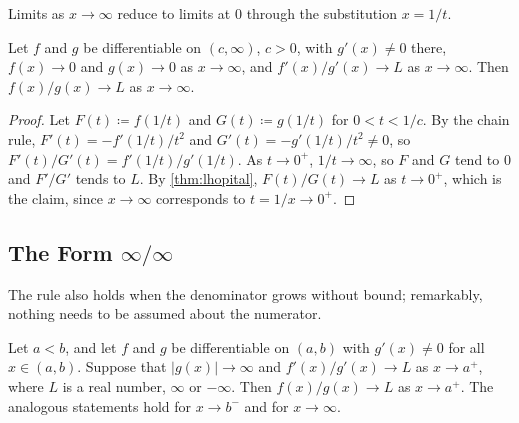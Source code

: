 Limits as $x\to\infty$ reduce to limits at $0$ through the substitution $x=1/t$.

\begin{corollary}
\label{cor:lhopital-infinity}
Let $f$ and $g$ be differentiable on $(c,\infty)$, $c>0$, with $g'(x)\ne0$ there, $f(x)\to0$ and $g(x)\to0$ as $x\to\infty$, and $f'(x)/g'(x)\to L$ as $x\to\infty$. Then $f(x)/g(x)\to L$ as $x\to\infty$.
\end{corollary}

\begin{proof}
Let $F(t)\coloneqq f(1/t)$ and $G(t)\coloneqq g(1/t)$ for $0<t<1/c$. By the chain rule, $F'(t)=-f'(1/t)/t^2$ and $G'(t)=-g'(1/t)/t^2\ne0$, so $F'(t)/G'(t)=f'(1/t)/g'(1/t)$. As $t\to0^+$, $1/t\to\infty$, so $F$ and $G$ tend to $0$ and $F'/G'$ tends to $L$. By \cref{thm:lhopital}, $F(t)/G(t)\to L$ as $t\to0^+$, which is the claim, since $x\to\infty$ corresponds to $t=1/x\to0^+$.
\end{proof}

\subsection{The Form \texorpdfstring{$\infty/\infty$}{infinity/infinity}}

The rule also holds when the denominator grows without bound; remarkably, nothing needs to be assumed about the numerator.

\begin{theorem}
\label{thm:lhopital-infinite}
Let $a<b$, and let $f$ and $g$ be differentiable on $(a,b)$ with $g'(x)\ne0$ for all $x\in(a,b)$. Suppose that $|g(x)|\to\infty$ and $f'(x)/g'(x)\to L$ as $x\to a^+$, where $L$ is a real number, $\infty$ or $-\infty$. Then $f(x)/g(x)\to L$ as $x\to a^+$. The analogous statements hold for $x\to b^-$ and for $x\to\infty$.
\end{theorem}

